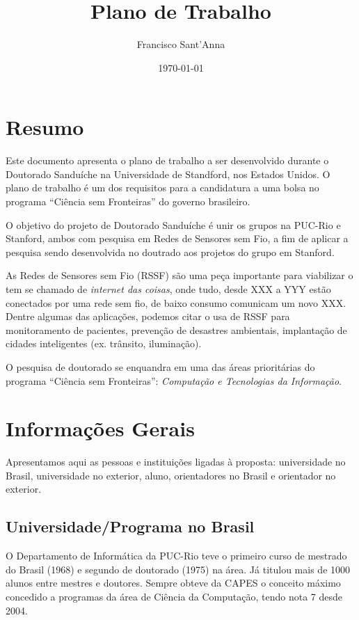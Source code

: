 \documentclass[11pt,a4paper]{report}
\title{Plano de Trabalho}
\author{Francisco Sant'Anna}
\date{\today}
\begin{document}
\maketitle

\tableofcontents

\chapter{Resumo}

Este documento apresenta o plano de trabalho a ser desenvolvido durante o
Doutorado Sanduíche na Universidade de Standford, nos Estados Unidos.
O plano de trabalho é um dos requisitos para a candidatura a uma bolsa no 
programa ``Ciência sem Fronteiras'' do governo brasileiro.

O objetivo do projeto de Doutorado Sanduíche é unir os grupos na PUC-Rio e 
Stanford, ambos com pesquisa em Redes de Sensores sem Fio, a fim de aplicar a 
pesquisa sendo desenvolvida no doutrado aos projetos do grupo em Stanford.

As Redes de Sensores sem Fio (RSSF) são uma peça importante para viabilizar o 
tem se chamado de \emph{internet das coisas}, onde tudo, desde XXX a YYY estão 
conectados por uma rede sem fio, de baixo consumo comunicam um novo XXX.
Dentre algumas das aplicações, podemos citar o usa de RSSF para monitoramento 
de pacientes, prevenção de desastres ambientais, implantação de cidades 
inteligentes (ex. trânsito, iluminação).

O pesquisa de doutorado se enquandra em uma das áreas prioritárias do programa 
``Ciência sem Fronteiras'': \emph{Computação e Tecnologias da Informação}.

\chapter{Informações Gerais}

Apresentamos aqui as pessoas e instituições ligadas à proposta: universidade no 
Brasil, universidade no exterior, aluno, orientadores no Brasil e orientador no 
exterior.

\section{Universidade/Programa no Brasil}

O Departamento de Informática da PUC-Rio teve o primeiro curso de mestrado do 
Brasil (1968) e segundo de doutorado (1975) na área.
Já titulou mais de 1000 alunos entre mestres e doutores.
Sempre obteve da CAPES o conceito máximo concedido a programas da área de 
Ciência da Computação, tendo nota 7 desde 2004.
\end{document}
